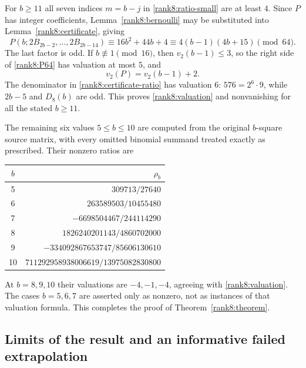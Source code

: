 \documentclass[11pt,letterpaper]{article}
\theoremstyle{definition}
\theoremstyle{remark}
\numberwithin{equation}{section}
\begin{document}
For $b\ge11$ all seven indices $m=b-j$ in
\eqref{rank8:ratio-small} are at least $4$.  Since $P$ has integer
coefficients, Lemma~\ref{rank8:bernoulli} may be substituted into
Lemma~\ref{rank8:certificate}, giving
\begin{equation}\label{rank8:P64}
 P(b;2B_{2b-2},\ldots,2B_{2b-14})
 \equiv16b^2+44b+4
 \equiv4(b-1)(4b+15)\pmod {64}.
\end{equation}
The last factor is odd.  If $b\not\equiv1\pmod {16}$, then
$v_2(b-1)\le3$, so the right side of \eqref{rank8:P64} has valuation
at most $5$, and
\[
 v_2(P)=v_2(b-1)+2.
\]
The denominator in \eqref{rank8:certificate-ratio} has valuation
$6$: $576=2^6\cdot9$, while $2b-5$ and $D_8(b)$ are odd.
This proves \eqref{rank8:valuation} and nonvanishing for all the
stated $b\ge11$.

The remaining six values $5\le b\le10$ are computed from the
original $b$-square source matrix, with every omitted binomial
summand treated exactly as prescribed.  Their nonzero ratios are
\begin{center}
\begin{tabular}{c r}
\hline
$b$ & $\rho_b$\\
\hline
5 & $309713/27640$\\
6 & $263589503/10455480$\\
7 & $-6698504467/244114290$\\
8 & $1826240201143/4860702000$\\
9 & $-334092867653747/85606130610$\\
10 & $711292958938006619/13975082830800$\\
\hline
\end{tabular}
\end{center}
At $b=8,9,10$ their valuations are $-4,-1,-4$, agreeing with
\eqref{rank8:valuation}.  The cases $b=5,6,7$ are asserted only
as nonzero, not as instances of that valuation formula.
This completes the proof of Theorem~\ref{rank8:theorem}.

\subsection{Limits of the result and an informative failed extrapolation}
\end{document}
